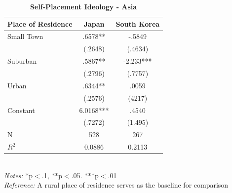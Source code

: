 \documentclass[12pt, titlepage]{article}
\newcommand\e{\emph}
\newcommand\tb{\textbf}
\begin{document}
\begin{singlespace}
	\begin{table}[H]
		\centering 
		\caption{\tb{Self-Placement Ideology - Asia}}
		\begin{tabulary}{\linewidth}{l c c}

			\hline
			\tb{Place of Residence} & \tb{Japan} & \tb{South Korea}\\
			\hline
			Small Town &.6578** & -.5849 \\
			&(.2648) & (.4634)\\
			Suburban&.5867** & -2.233*** \\
			& (.2796) & (.7757)\\
			Urban & .6344** &.0059 \\
			& (.2576) & (4217)\\
			Constant& 6.0168*** & .4540 \\
			& (.7272) & (1.495)\\
			N&528 & 267\\
			$R^2$&0.0886 & 0.2113\\
			\hline
		\end{tabulary}
		\\
		\e{Notes:} *p$<$.1, **p$<$.05. ***p$<$.01 \\
		\e{Reference:} A rural place of residence serves as the baseline for comparison
		\label{table12}
	\end{table}
\end{singlespace}
\end{document}
